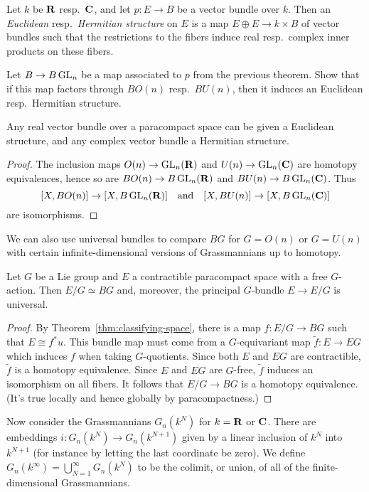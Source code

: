 \documentclass[a4paper,openany]{scrbook}
\begin{document}
Let $k$ be $\mathbf R$ resp.\ $\mathbf C$, and let $p\colon E \to B$ be a vector bundle over $k$. Then an \textit{Euclidean} resp.\ \textit{Hermitian structure} on $E$ is a map $E \oplus E \to k \times B$ of vector bundles such that the restrictions to the fibers induce real resp.\ complex inner products on these fibers.
\begin{exer}
Let $B \to B \operatorname{GL}_n$ be a map associated to $p$ from the previous theorem. Show that if this map factors through $B O(n)$ resp.\ $BU(n)$, then it induces an Euclidean resp.\ Hermitian structure.
\end{exer}	
\begin{corollary}\label{cor:euclideanstructure}
Any real vector bundle over a paracompact space can be given a Euclidean structure, and any complex vector bundle a Hermitian structure. 
\end{corollary}
\begin{proof}
The inclusion maps $O(n) \to \operatorname{GL}_n(\mathbf R)$ and $U(n) \to \operatorname{GL}_n(\mathbf C)$ are homotopy equivalences, hence so are $BO(n) \to B\operatorname{GL}_n(\mathbf R)$ and $BU(n) \to B\operatorname{GL}_n(\mathbf C)$. Thus
\[
[X,BO(n)] \to [X,B\operatorname{GL}_n(\mathbf R)] \quad \text{and} \quad [X,BU(n)] \to [X,B\operatorname{GL}_n(\mathbf C)]
\]
are isomorphisms.
\end{proof}

We can also use universal bundles to compare $BG$ for $G=O(n)$ or $G=U(n)$ with certain infinite-dimensional versions of Grassmannians up to homotopy.

\begin{corollary}\label{cor:characterizationfouniversalGspaces}
Let $G$ be a Lie group and $E$ a contractible paracompact space with a free $G$-action. Then $E/G \simeq BG$ and, moreover, the principal $G$-bundle $E \to E/G$ is universal.
\end{corollary}
\begin{proof}
By Theorem~\ref{thm:classifying-space}, there is a map $f\colon E/G \to BG$ such that $E \cong f^*u$. This bundle map must come from a $G$-equivariant map $\tilde f\colon E \to EG$ which induces $f$ when taking $G$-quotients. Since both $E$ and $EG$ are contractible, $\tilde f$ is a homotopy equivalence. Since $E$ and $EG$ are $G$-free, $\tilde f$ induces an isomorphism on all fibers. It follows that $E/G \to BG$ is a homotopy equivalence. (It's true locally and hence globally by paracompactness.)
\end{proof}

Now consider the Grassmannians $G_n(k^N)$ for $k=\mathbf R$ or $\mathbf C$. There are embeddings $i\colon G_n(k^N) \to G_n(k^{N+1})$ given by a linear inclusion of $k^N$ into $k^{N+1}$ (for instance by letting the last coordinate be zero). We define $G_n(k^\infty) = \bigcup_{N=1}^\infty G_n(k^N)$ to be the colimit, or union, of all of the finite-dimensional Grassmannians. 
\end{document}

